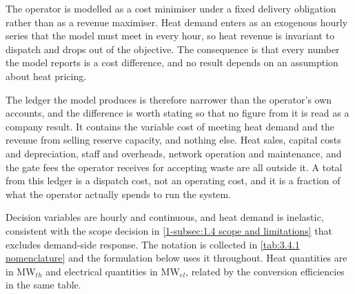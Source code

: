 The operator is modelled as a cost minimiser under a fixed delivery obligation rather than as a revenue maximiser. Heat demand enters as an exogenous hourly series that the model must meet in every hour, so heat revenue is invariant to dispatch and drops out of the objective. The consequence is that every number the model reports is a cost difference, and no result depends on an assumption about heat pricing.

The ledger the model produces is therefore narrower than the operator's own accounts, and the difference is worth stating so that no figure from it is read as a company result. It contains the variable cost of meeting heat demand and the revenue from selling reserve capacity, and nothing else. Heat sales, capital costs and depreciation, staff and overheads, network operation and maintenance, and the gate fees the operator receives for accepting waste are all outside it. A total from this ledger is a dispatch cost, not an operating cost, and it is a fraction of what the operator actually spends to run the system.

Decision variables are hourly and continuous, and heat demand is inelastic, consistent with the scope decision in \autoref{1-subsec:1.4 scope and limitations} that excludes demand-side response. The notation is collected in \autoref{tab:3.4.1 nomenclature} and the formulation below uses it throughout. Heat quantities are in MW$_{th}$ and electrical quantities in MW$_{el}$, related by the conversion efficiencies in the same table.

